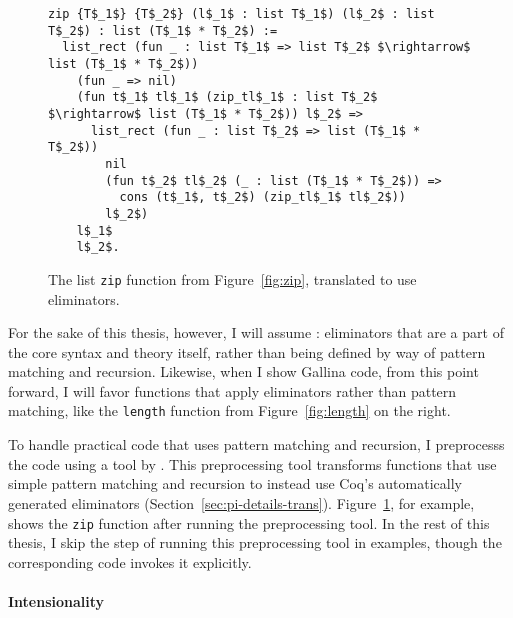 \begin{figure}
\begin{lstlisting}
zip {T$_1$} {T$_2$} (l$_1$ : list T$_1$) (l$_2$ : list T$_2$) : list (T$_1$ * T$_2$) :=
  list_rect (fun _ : list T$_1$ => list T$_2$ $\rightarrow$ list (T$_1$ * T$_2$))
    (fun _ => nil)
    (fun t$_1$ tl$_1$ (zip_tl$_1$ : list T$_2$ $\rightarrow$ list (T$_1$ * T$_2$)) l$_2$ =>
      list_rect (fun _ : list T$_2$ => list (T$_1$ * T$_2$))
        nil
        (fun t$_2$ tl$_2$ (_ : list (T$_1$ * T$_2$)) =>
          cons (t$_1$, t$_2$) (zip_tl$_1$ tl$_2$))
        l$_2$)
    l$_1$
    l$_2$.
\end{lstlisting}
\caption{The list \lstinline{zip} function from Figure~\ref{fig:zip}, translated to use eliminators.}
\label{fig:zip-elim}
\end{figure}

For the sake of this thesis, however, I will assume : eliminators that are a part of the core syntax and theory itself,
rather than being defined by way of pattern matching and recursion.
Likewise, when I show Gallina code, from this point forward, I will favor functions that apply eliminators rather than pattern matching, like the \lstinline{length} function from Figure~\ref{fig:length}
on the right.

To handle practical code that uses pattern matching and recursion,
I preprocesss the code using a tool by .
This preprocessing tool transforms functions that use simple pattern matching and recursion
to instead use Coq's automatically generated eliminators (Section~\ref{sec:pi-details-trans}).
Figure~\ref{fig:zip-elim}, for example, shows the \lstinline{zip} function after running the preprocessing tool.
In the rest of this thesis, I skip the step of running this preprocessing tool in examples,
though the corresponding code invokes it explicitly.

\paragraph{Intensionality}

